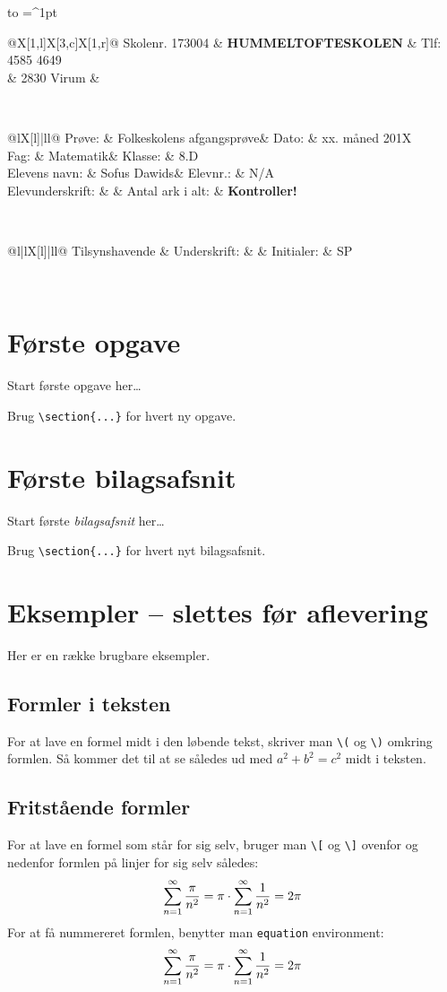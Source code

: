 \documentclass[a4,12pt]{article}
\makeatletter
\numberwithin{equation}{section}
\newcommand{\skoleklasse}{8.D} %
\newcommand{\proevetype}{Folkeskolens afgangsprøve}
\newcommand{\proevefag}{Matematik}
\newcommand{\elevnavn}{Sofus Dawids}
\newcommand{\elevnummer}{N/A} %
\newcommand{\tilsynshavende}{SP} %
\newcommand{\eksamensdato}{xx. måned 201X} %
\newcommand{\antalarkialt}{\pageref*{LastPage} \textbf{Kontroller!}} %
\newcommand{\eksamensforsideboks}{
\noindent
\begin{tabu} to  \textwidth {|X[c]|}
  \hline
  \tabulinesep=^1pt
  \begin{tabu} {@{}X[1,l]X[3,c]X[1,r]@{}}
    Skolenr. 173004 & {\large \textbf{HUMMELTOFTESKOLEN}} & Tlf: 4585 4649 \\
  & 2830 Virum & \\
  \end{tabu} \\
  \hline
  \begin{tabu} {@{}lX[l]|ll@{}}
    Prøve: & \proevetype & Dato: & \eksamensdato \\
    Fag: & \proevefag & Klasse: & \skoleklasse \\
    Elevens navn: & \elevnavn & Elevnr.: & \elevnummer \\
    Elevunderskrift: & & Antal ark i alt: & \antalarkialt \\[0.5cm]
  \end{tabu} \\
  \hline
  \begin{tabu} {@{}l|lX[l]|ll@{}}
    Tilsynshavende & Underskrift: & & Initialer: & \tilsynshavende \\[0.5cm]
  \end{tabu} \\
  \hline
\end{tabu}
\vspace{1cm}
}
\newcommand*{\tableofcontentsnobreak}{\@starttoc{toc}}
\makeatother
\begin{document}
\thispagestyle{plain}
\eksamensforsideboks

\tableofcontentsnobreak

\section{Første opgave}
Start første opgave her\ldots

Brug \verb$\section{...}$ for hvert ny opgave.

\appendix
\section{Første bilagsafsnit}
Start første \emph{bilagsafsnit} her\ldots

Brug \verb$\section{...}$ for hvert nyt bilagsafsnit.

\section{Eksempler -- slettes før aflevering}
Her er en række brugbare eksempler.

\subsection{Formler i teksten}
For at lave en formel midt i den løbende tekst, skriver man \verb$\($ og \verb$\)$ omkring formlen.
Så kommer det til at se således ud med \( a^2 + b^2 = c^2 \) midt i teksten.

\subsection{Fritstående formler}
For at lave en formel som står for sig selv, bruger man \verb$\[$ og \verb$\]$ ovenfor og nedenfor formlen på linjer for sig selv således:
\[
  \sum\limits_{n=1}^\infty{\pi \over n^2}
    = \pi \cdot \sum\limits_{n=1}^\infty{1 \over n^2}
    = 2\pi
\]
For at få nummereret formlen, benytter man \verb$equation$ environment:
\begin{equation}
  \sum\limits_{n=1}^\infty{\pi \over n^2}
    = \pi \cdot \sum\limits_{n=1}^\infty{1 \over n^2}
    = 2\pi
\end{equation}
\end{document}
